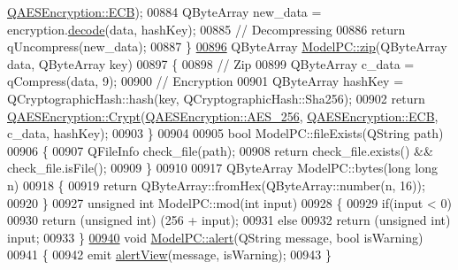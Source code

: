 \begin{DoxyCode}
{      \hyperlink{class_q_a_e_s_encryption_ad3e031c49a3d56566379d75b40b7b255a4ca7f51778e2adf1f464164a0ba8e75e}{QAESEncryption::ECB});
00884     QByteArray new\_data = encryption.\hyperlink{class_q_a_e_s_encryption_a58f972f2b66c2454edd5112495463bba}{decode}(data, hashKey);
00885     \textcolor{comment}{// Decompressing}
00886     \textcolor{keywordflow}{return} qUncompress(new\_data);
00887 \}
\hypertarget{modelpc_8cpp_source.tex_l00896}{}\hyperlink{class_model_p_c_afebbbfa4b07deba4f68fc6dfb50f353f}{00896} QByteArray \hyperlink{class_model_p_c_afebbbfa4b07deba4f68fc6dfb50f353f}{ModelPC::zip}(QByteArray data, QByteArray key)
00897 \{
00898     \textcolor{comment}{// Zip}
00899     QByteArray c\_data = qCompress(data, 9);
00900     \textcolor{comment}{// Encryption}
00901     QByteArray hashKey = QCryptographicHash::hash(key, QCryptographicHash::Sha256);
00902     \textcolor{keywordflow}{return} \hyperlink{class_q_a_e_s_encryption_a43819eeb6a7cb29fbd3cb6ad640dcbdf}{QAESEncryption::Crypt}(\hyperlink{class_q_a_e_s_encryption_abe48208f4f6c7d68e6a10b49b9d0b7bdacde97774ab1d4c609e04b0dd13a1e1f7}{QAESEncryption::AES\_256}, 
      \hyperlink{class_q_a_e_s_encryption_ad3e031c49a3d56566379d75b40b7b255a4ca7f51778e2adf1f464164a0ba8e75e}{QAESEncryption::ECB}, c\_data, hashKey);
00903 \}
00904 
00905 \textcolor{keywordtype}{bool} ModelPC::fileExists(QString path)
00906 \{
00907     QFileInfo check\_file(path);
00908     \textcolor{keywordflow}{return} check\_file.exists() && check\_file.isFile();
00909 \}
00910 
00917 QByteArray ModelPC::bytes(\textcolor{keywordtype}{long} \textcolor{keywordtype}{long} n)
00918 \{
00919     \textcolor{keywordflow}{return} QByteArray::fromHex(QByteArray::number(n, 16));
00920 \}
00927 \textcolor{keywordtype}{unsigned} \textcolor{keywordtype}{int} ModelPC::mod(\textcolor{keywordtype}{int} input)
00928 \{
00929     \textcolor{keywordflow}{if}(input < 0)
00930         \textcolor{keywordflow}{return} (\textcolor{keywordtype}{unsigned} \textcolor{keywordtype}{int}) (256 + input);
00931     \textcolor{keywordflow}{else}
00932         \textcolor{keywordflow}{return} (\textcolor{keywordtype}{unsigned} \textcolor{keywordtype}{int}) input;
00933 \}
\hypertarget{modelpc_8cpp_source.tex_l00940}{}\hyperlink{class_model_p_c_a9079a101d83672aa48fd2dbac797de40}{00940} \textcolor{keywordtype}{void} \hyperlink{class_model_p_c_a9079a101d83672aa48fd2dbac797de40}{ModelPC::alert}(QString message, \textcolor{keywordtype}{bool} isWarning)
00941 \{
00942     emit \hyperlink{class_model_p_c_af0217a7ca5671e26090dc50a5dccdaf5}{alertView}(message, isWarning);
00943 \}
}
\end{DoxyCode}
